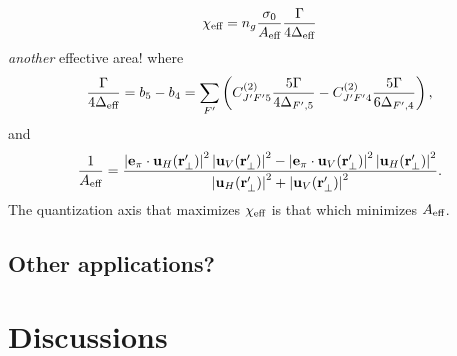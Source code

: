 \documentclass[preprint,aps,pra,onecolumn]{revtex4-1} %
\newcommand{\comment}[1]{{\color{Maroon} #1}}
\begin{document}
\begin{equation}
\chi_{\text{eff}} = n_g\frac{\sigma_0}{A_{\text{eff}}} \frac{\Gamma}{4\Delta_{\text{eff}}}
\end{equation}
\comment{\emph{another} effective area!} where
\begin{equation} 
\frac{\Gamma}{4\Delta_{\text{eff}}} = b_5 - b_4 = \sum_{F'}  \left( C^{(2)}_{J'F'5}\frac{5\Gamma}{4\Delta_{F',5}} -  C^{(2)}_{J'F'4}\frac{5\Gamma}{6 \Delta_{F',4} } \right),
\end{equation}
and 
\begin{equation}
\frac{1}{A_{\text{eff}}} = \frac{\left|\mathbf{e}_\pi \cdot \mathbf{u}_H(\mathbf{r}'_\perp)\right|^2 \left|\mathbf{u}_V(\mathbf{r}'_\perp)\right|^2 - 
\left|\mathbf{e}_\pi \cdot \mathbf{u}_V(\mathbf{r}'_\perp)\right|^2 \left|\mathbf{u}_H(\mathbf{r}'_\perp)\right|^2}
{ \left|\mathbf{u}_H(\mathbf{r}'_\perp)\right|^2 +\left|\mathbf{u}_V(\mathbf{r}'_\perp)\right|^2 }.
\end{equation}
The quantization axis that maximizes $\chi_{\text{eff}}$ is that which minimizes $A_{\text{eff}}$.




\subsection{Other applications?} 


\section{Discussions}




%
%


%	
%	
\end{document}
